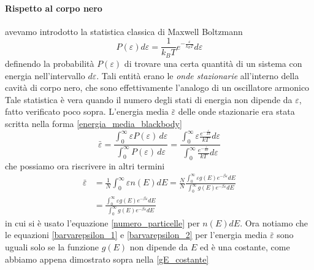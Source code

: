 \paragraph{Rispetto al corpo nero} avevamo introdotto la statistica classica di Maxwell Boltzmann 
\begin{equation}
P(\varepsilon) d\varepsilon = \frac{1}{k_BT} e^{ -\frac{\varepsilon}{k_BT} } d\varepsilon
\end{equation}
definendo la probabilità $P(\varepsilon)$ di trovare una certa quantità di un sistema con energia nell'intervallo $d\varepsilon$.
Tali entità erano le \textit{onde stazionarie} all'interno della cavità di corpo nero, che sono effettivamente l'analogo di un oscillatore armonico
Tale statistica è vera quando il numero degli stati di energia non dipende da $\varepsilon$, fatto verificato poco sopra.
L'energia media $\bar \varepsilon$ delle onde stazionarie era stata scritta nella forma \ref{energia_media_blackbody}
\begin{equation}
\bar\varepsilon=\frac{\int_{0}^{\infty} \varepsilon P(\varepsilon)\,d\varepsilon}{\int_{0}^{\infty} P(\varepsilon)\,d\varepsilon} = \frac{\int_{0}^{\infty} \varepsilon \frac{ e^{ - \frac{\varepsilon}{kT } } }{kT } d\varepsilon}{\int_{0}^{\infty} \frac{ e^{ - \frac{\varepsilon}{kT } } }{kT }d\varepsilon}
\label{barvarepsilon_1}
\end{equation}
che possiamo ora riscrivere in altri termini
\begin{equation}
\begin{split}
\bar \varepsilon & = \frac{1}{N} \int_0^{\infty} \varepsilon n(E)dE = \frac{N}{N} \frac{  \int_0^{\infty} \varepsilon g(E) e^{ -\beta \varepsilon } dE  }{  \int_0^{\infty} g(E) e^{ -\beta \varepsilon } dE  } \\
& = \frac{  \int_0^{\infty} \varepsilon g(E) e^{ -\beta \varepsilon } dE  }{  \int_0^{\infty} g(E) e^{ -\beta \varepsilon } dE  }
\label{barvarepsilon_2}
\end{split}
\end{equation}
in cui si è usato l'equazione \ref{numero_particelle} per  $n(E)dE$.
Ora notiamo che le equazioni \ref{barvarepsilon_1} e \ref{barvarepsilon_2} per l'energia media $\bar \varepsilon$ sono uguali solo se la funzione $g(E)$ non dipende da $E$ ed è una costante, come abbiamo appena dimostrato sopra nella \ref{gE_costante}










